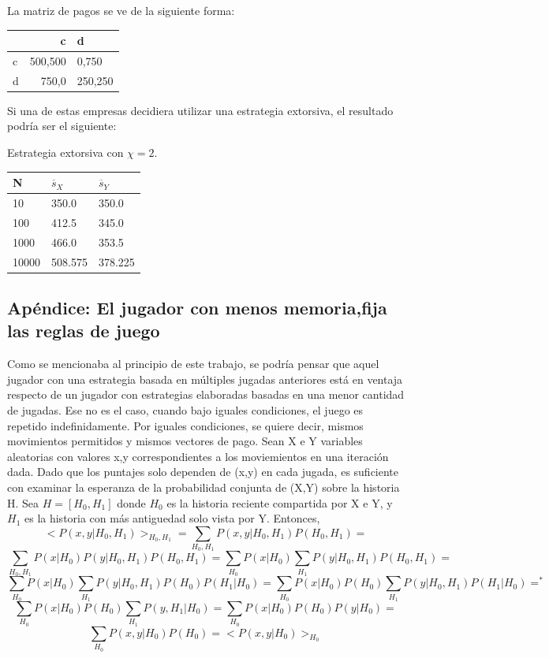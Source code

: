 \documentclass[12pt]{article}
\begin{document}
La matriz de pagos se ve de la siguiente forma:

\begin{tabular}{|l|r| l|}
  \hline   
     & c & d \\\hline
   c & 500,500 & 0,750 \\ \hline
   d & 750,0 & 250,250 \\  \hline  
\end{tabular} 

Si una de estas empresas decidiera utilizar una estrategia extorsiva, el resultado podría ser el
siguiente:

Estrategia extorsiva con $\chi=2$. 
\begin{center}
  \begin{tabular}{| l | l | l |}
    \hline
    N & $\overline s_X$ & $\overline s_Y$ \\\hline
    10 & 350.0 &350.0 \\\hline
    100 & 412.5 & 345.0 \\\hline
    1000 & 466.0 & 353.5 \\\hline
    10000 & 508.575 & 378.225 \\\hline    
  \end{tabular}
\end{center}


\subsection{Apéndice: El jugador con menos memoria,fija las reglas de juego}
Como se mencionaba al principio de este trabajo, se podría pensar que aquel jugador
con una estrategia basada en múltiples jugadas anteriores está en ventaja respecto de
un jugador con estrategias elaboradas basadas en una menor cantidad de jugadas.
Ese no es el caso, cuando bajo iguales condiciones, el juego es repetido  indefinidamente.
Por iguales condiciones, se quiere decir, mismos movimientos permitidos y mismos vectores
de pago.\newline
Sean X e Y variables aleatorias con valores x,y correspondientes a los moviemientos en una iteración dada.
Dado que los puntajes solo dependen de (x,y) en cada jugada, es suficiente con examinar la esperanza
de la probabilidad conjunta de  (X,Y) sobre la historia H.
Sea $H=[H_0,H_1]$ donde $H_0$ es la historia reciente compartida por X e Y, y $H_1$ es la historia con más antiguedad
solo vista por Y. Entonces,
$$<P(x,y|H_0,H_1)>_{H_0,H_1}=\sum_{H_0,H_1}P(x,y|H_0,H_1) P(H_0,H_1)=$$
$$\sum_{H_0,H_1} P(x|H_0)P(y|H_0,H_1)P(H_0,H_1)=\sum_{H_0} P(x|H_0) \sum_{H_1} P(y|H_0,H_1)P(H_0,H_1)=$$
$$\sum_{H_0}P(x|H_0)\sum_{H_1}P(y|H_0,H_1)P(H_0)P(H_1|H_0) =\sum_{H_0}P(x|H_0)P(H_0) \sum_{H_1}P(y|H_0,H_1)P(H_1|H_0)=^*$$
$$\sum_{H_0}P(x|H_0)P(H_0)\sum_{H_1} P(y,H_1|H_0)=\sum_{H_0}P(x|H_0)P(H_0)P(y|H_0)=$$
$$\sum_{H_0}P(x,y|H_0)P(H_0)=<P(x,y|H_0)>_{H_0} $$
\end{document}
